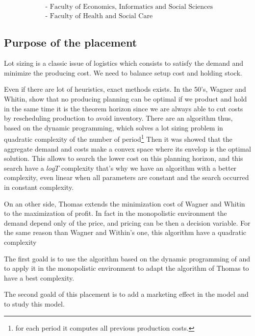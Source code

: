 \begin{align*}
    &\text{- Faculty of Economics, Informatics and Social Sciences }\\
    &\text{- Faculty of Health and Social Care}
\end{align*}


\subsection{Purpose of the placement}
Lot sizing is a classic issue of logistics which consists to satisfy the demand 
and minimize the producing cost. We need to balance setup cost and holding stock.

Even if there are lot of heuristics, exact methods exists. In the 50's, Wagner
and Whitin\cite{Wagner&Whitin58}, show that no producing planning can be
optimal if we product and hold in the same time it is the theorem horizon since
we are always able to cut costs by rescheduling production to avoid inventory.
There are an algorithm thus, based on the dynamic programming, which solves a
lot sizing problem in quadratic complexity of the number of period\footnote{for
each period it computes all previous production costs.} Then it was showed that
the aggregate demand and costs make a convex space where its envelop is the
optimal solution\cite{Wagelmans&Kolen92}.  This allows to search the lower cost
on this planning horizon, and this search have a $logT$ complexity that's why
we have an algorithm with a better complexity, even linear when all parameters
are constant and the search occurred in constant
complexity.

On an other side, Thomas\cite{Thomas70} extends the minimization cost of Wagner
and Whitin \cite{Wagner&Whitin58} to the maximization of profit. In fact in the
monopolistic environment the demand depend only of the price, and pricing can
be then a decision variable. For the same reason than Wagner and Within's one,
this algorithm have a quadratic complexity
 
The first goald is to use the algorithm based on the dynamic programming 
of \cite{Wagelmans&Kolen92} and to apply it in the monopolistic environment to 
adapt the algorithm of Thomas to have a best complexity.

The second goald of this placement is to add a marketing effect in the model
and to study this model. 

